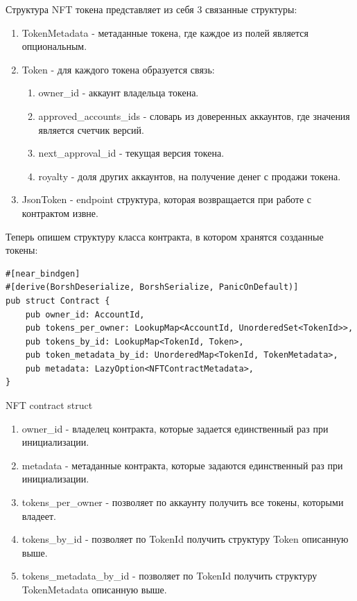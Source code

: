 Структура NFT токена представляет из себя 3 связанные структуры:
\begin{enumerate}
    \item TokenMetadata - метаданные токена, где каждое из полей является опциональным.
    \item Token - для каждого токена образуется связь:
    \begin{enumerate}
        \item owner\_id - аккаунт владельца токена.
        \item approved\_accounts\_ids - словарь из доверенных аккаунтов, где значения является счетчик версий.
        \item next\_approval\_id - текущая версия токена.
        \item royalty - доля других аккаунтов, на получение денег с продажи токена.
    \end{enumerate}
    \item JsonToken - endpoint структура, которая возвращается при работе с контрактом извне.
\end{enumerate}

Теперь опишем структуру класса контракта, в котором хранятся созданные токены:
\begin{listing}[H]
\begin{verbatim}
#[near_bindgen]
#[derive(BorshDeserialize, BorshSerialize, PanicOnDefault)]
pub struct Contract {
    pub owner_id: AccountId,
    pub tokens_per_owner: LookupMap<AccountId, UnorderedSet<TokenId>>,
    pub tokens_by_id: LookupMap<TokenId, Token>,
    pub token_metadata_by_id: UnorderedMap<TokenId, TokenMetadata>,
    pub metadata: LazyOption<NFTContractMetadata>,
}
\end{verbatim}
\caption{NFT contract struct}
\label{nftcontract.struct}
\end{listing}

\begin{enumerate}
\item owner\_id - владелец контракта, которые задается единственный раз при инициализации.
\item metadata - метаданные контракта, которые задаются единственный раз при инициализации.
\item tokens\_per\_owner - позволяет по аккаунту получить все токены, которыми владеет.
\item tokens\_by\_id - позволяет по TokenId получить структуру Token описанную выше.
\item tokens\_metadata\_by\_id - позволяет по TokenId получить структуру TokenMetadata описанную выше.
\end{enumerate}

